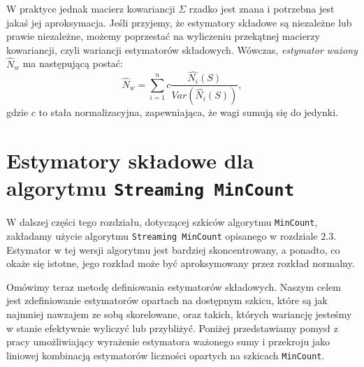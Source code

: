 W praktyce jednak macierz kowariancji $\Sigma$ rzadko jest znana i potrzebna jest jakaś jej aproksymacja.
Jeśli przyjemy, że estymatory składowe są niezależne
lub prawie niezależne, możemy poprzestać na wyliczeniu przekątnej macierzy kowariancji, czyli wariancji estymatorów składowych. Wówczas, \textit{estymator ważony} $\hat{N}_w$  ma następującą postać:
\begin{equation}
\label{wazony}
    \hat{N}_w = \sum_{i=1}^{n}c\frac{\hat{N_i}(S)}{Var(\hat{N_i}(S))},
\end{equation}
gdzie $c$ to stała normalizacyjna, zapewniająca, że wagi sumują się do jedynki.

\section{Estymatory składowe dla algorytmu \texttt{Streaming MinCount}}

W dalszej części tego rozdziału, dotyczącej szkiców algorytmu \texttt{MinCount}, zakładamy użycie algorytmu \texttt{Streaming MinCount} opisanego w rozdziale $2.3$.
Estymator w tej wersji algorytmu jest bardziej skoncentrowany, a ponadto, co okaże się istotne, jego rozkład może być aproksymowany przez rozkład normalny. 

Omówimy teraz metodę  definiowania estymatorów składowych. Naszym celem jest zdefiniowanie estymatorów opartach na dostępnym szkicu, które są jak najmniej nawzajem ze sobą skorelowane, oraz takich, których wariancję jesteśmy w stanie efektywnie wyliczyć lub przybliżyć. Poniżej przedstawiamy pomysł z pracy \cite{ting} umożliwiający wyrażenie estymatora ważonego sumy i przekroju jako  liniowej kombinacją  estymatorów liczności opartych na szkicach \texttt{MinCount}.

